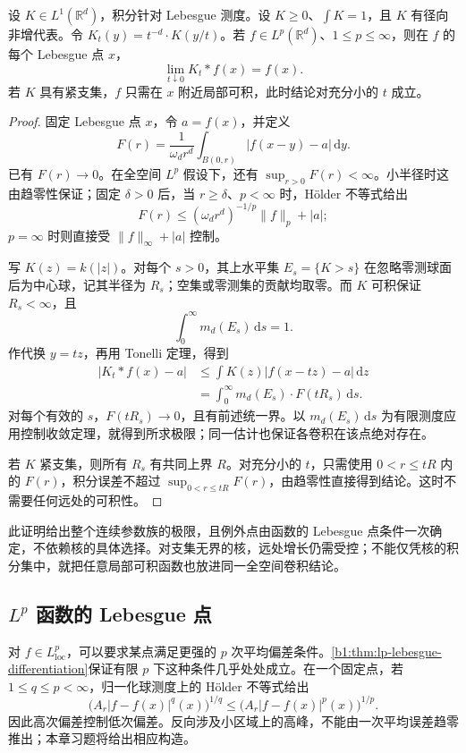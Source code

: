 \begin{proposition}\label{b1:prop:approx-identity-lebesgue-point}
设 \(K\in L^1(\mathbb R^d)\)，积分针对 Lebesgue 测度。设 \(K\geq0\)、\(\int K=1\)，且 \(K\) 有径向非增代表。令 \(K_t(y)=t^{-d}\cdot K(y/t)\)。若 \(f\in L^p(\mathbb R^d)\)、\(1\leq p\leq\infty\)，则在 \(f\) 的每个 Lebesgue 点 \(x\)，
\[
 \lim_{t\downarrow0}K_t*f(x)=f(x).
\]
若 \(K\) 具有紧支集，\(f\) 只需在 \(x\) 附近局部可积，此时结论对充分小的 \(t\) 成立。
\end{proposition}
\begin{proof}
固定 Lebesgue 点 \(x\)，令 \(a=f(x)\)，并定义
\[
 F(r)=\frac1{\omega_dr^d}\int_{B(0,r)}|f(x-y)-a|\,\mathrm dy.
\]
已有 \(F(r)\to0\)。在全空间 \(L^p\) 假设下，还有 \(\sup_{r>0}F(r)<\infty\)。小半径时这由趋零性保证；固定 \(\delta>0\) 后，当 \(r\geq\delta\)、\(p<\infty\) 时，Hölder 不等式给出
\[
 F(r)\leq(\omega_dr^d)^{-1/p}\|f\|_p+|a|;
\]
\(p=\infty\) 时则直接受 \(\|f\|_\infty+|a|\) 控制。

写 \(K(z)=k(|z|)\)。对每个 \(s>0\)，其上水平集 \(E_s=\{K>s\}\) 在忽略零测球面后为中心球，记其半径为 \(R_s\)；空集或零测集的贡献均取零。而 \(K\) 可积保证 \(R_s<\infty\)，且
\[
 \int_0^\infty m_d(E_s)\,\mathrm ds=1.
\]
作代换 \(y=tz\)，再用 Tonelli 定理，得到
\[
 \begin{aligned}
 |K_t*f(x)-a|
 &\leq\int K(z)|f(x-tz)-a|\,\mathrm dz\\
 &=\int_0^\infty m_d(E_s)\cdot F(tR_s)\,\mathrm ds.
 \end{aligned}
\]
对每个有效的 \(s\)，\(F(tR_s)\to0\)，且有前述统一界。以 \(m_d(E_s)\,\mathrm ds\) 为有限测度应用控制收敛定理，就得到所求极限；同一估计也保证各卷积在该点绝对存在。

若 \(K\) 紧支集，则所有 \(R_s\) 有共同上界 \(R\)。对充分小的 \(t\)，只需使用 \(0<r\leq tR\) 内的 \(F(r)\)，积分误差不超过 \(\sup_{0<r\leq tR}F(r)\)，由趋零性直接得到结论。这时不需要任何远处的可积性。
\end{proof}

此证明给出整个连续参数族的极限，且例外点由函数的 Lebesgue 点条件一次确定，不依赖核的具体选择。对支集无界的核，远处增长仍需受控；不能仅凭核的积分集中，就把任意局部可积函数也放进同一全空间卷积结论。

\subsection{\texorpdfstring{\(L^p\)}{Lp} 函数的 Lebesgue 点}
\label{b1:subsec:140404}

对 \(f\in L^p_{\mathrm{loc}}\)，可以要求某点满足更强的 \(p\) 次平均偏差条件。\cref{b1:thm:lp-lebesgue-differentiation}保证有限 \(p\) 下这种条件几乎处处成立。在一个固定点，若 \(1\leq q\leq p<\infty\)，归一化球测度上的 Hölder 不等式给出
\[
 \bigl(A_r|f-f(x)|^q(x)\bigr)^{1/q}
 \leq\bigl(A_r|f-f(x)|^p(x)\bigr)^{1/p}.
\]
因此高次偏差控制低次偏差。反向涉及小区域上的高峰，不能由一次平均误差趋零推出；本章习题将给出相应构造。

